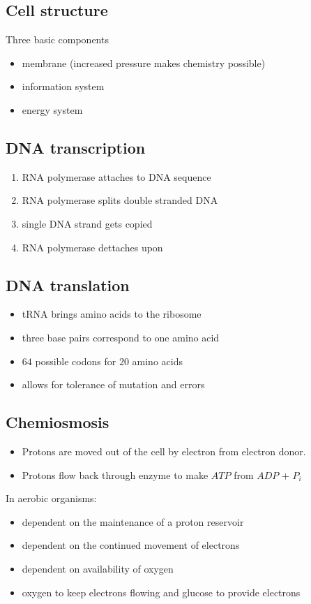 \documentclass{article}
\theoremstyle{sltheorem}
\begin{document}
\subsection{Cell structure}
Three basic components
\begin{itemize}
    \item membrane (increased pressure makes chemistry possible)
    \item information system
    \item energy system
\end{itemize}
\subsection{DNA transcription}
\begin{enumerate}
    \item RNA polymerase attaches to DNA sequence
    \item RNA polymerase splits double stranded DNA
    \item single DNA strand gets copied
    \item RNA polymerase dettaches upon 
\end{enumerate}
\subsection{DNA translation}
\begin{itemize}
    \item tRNA brings amino acids to the ribosome
    \item three base pairs correspond to one amino acid
    \item $64$ possible codons for $20$ amino acids
    \item allows for tolerance of mutation and errors
\end{itemize}
\subsection{Chemiosmosis}
\begin{itemize}
    \item Protons are moved out of the cell by electron from electron donor.
    \item Protons flow back through enzyme to make $ATP$ from $ADP$ + $P_i$
\end{itemize}
In aerobic organisms:
\begin{itemize}
    \item dependent on the maintenance of a proton reservoir
    \item dependent on the continued movement of electrons
    \item dependent on availability of oxygen
    \item oxygen to keep electrons flowing and glucose to provide electrons
\end{itemize}
\end{document}
